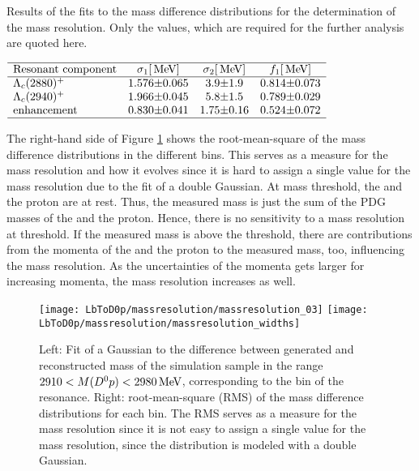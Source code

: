 \begin{table}[h]
    \centering
    \caption{Results of the fits to the mass difference distributions for the determination of the mass resolution. Only the values, which are required for the further analysis are quoted here.}
    \label{tab:Massresolution}
    $\begin{array}{lr@{\pm}lr@{\pm}lr@{\pm}l}
    \hline
    \text{Resonant component} & \multicolumn{2}{c}{\sigma_1 [\mev]} & \multicolumn{2}{c}{\sigma_2 [\mev]} & \multicolumn{2}{c}{f_1 [\mev]} \\
    \hline
    \LcResI   & \MassresResIwIval & \MassresResIwIerr & \MassresResIwIIval & \MassresResIwIIerr & \MassresResIfIval & \MassresResIfIerr \\
    \LcResII   & \MassresResIIwIval & \MassresResIIwIerr & \MassresResIIwIIval & \MassresResIIwIIerr & \MassresResIIfIval & \MassresResIIfIerr \\
    \text{enhancement} & \MassresStructurewIval & \MassresStructurewIerr & \MassresStructurewIIval & \MassresStructurewIIerr & \MassresStructurefIval & \MassresStructurefIerr \\
    \hline
    \end{array}$
\end{table}
The right-hand side of Figure \ref{fig:massresolution} shows the root-mean-square of the mass difference distributions in the different bins.
This serves as a measure for the mass resolution and how it evolves since it is hard to assign a single value for the mass resolution due to the fit of a double Gaussian.
At \Dz\proton mass threshold, the \Dz and the proton are at rest.
Thus, the measured \Dz\proton mass is just the sum of the PDG masses of the \Dz and the proton.
Hence, there is no sensitivity to a mass resolution at threshold.
If the measured \Dz\proton mass is above the threshold, there are contributions from the momenta of the \Dz and the proton to the measured \Dz\proton mass, too, influencing the mass resolution.
As the uncertainties of the momenta gets larger for increasing momenta, the mass resolution increases as well.
\begin{figure}[ptb]
    \centering
	\texttt{[image: LbToD0p/massresolution/massresolution\_03]}
	\texttt{[image: LbToD0p/massresolution/massresolution\_widths]}
	\caption{Left: Fit of a Gaussian to the difference between generated and reconstructed \Dz\proton mass of the simulation sample in the range $2910 < M({{D}^0}{p}) < 2980 \mathrm{\,Me\kern -0.1em V}$, corresponding to the bin of the \LcResII resonance. Right: root-mean-square (RMS) of the mass difference distributions for each bin.
    The RMS serves as a measure for the mass resolution since it is not easy to assign a single value for the mass resolution, since the distribution is modeled with a double Gaussian.}
    \label{fig:massresolution}
\end{figure}


